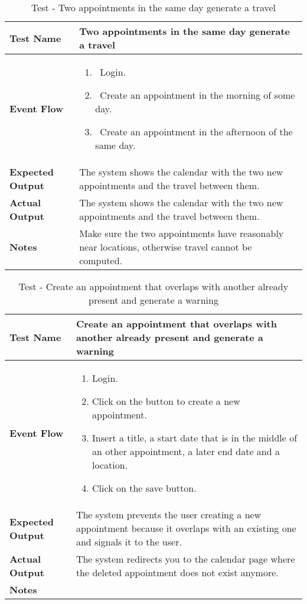 \begin{table}[h]	
\centering
\def\arraystretch{1.5}
\begin{tabular}{|m{7cm}|m{7cm}|}
	\hline
	\textbf{Test Name}            &  Two appointments in the same day generate a travel  \\ \hline
	\textbf{Event Flow}             & 
		\begin{enumerate}
			\item~Login.
			\item~Create an appointment in the morning of some day.
			\item~Create an appointment in the afternoon of the same day.
		\end{enumerate}
	  \\ \hline
	\textbf{Expected Output}  &   The system shows the calendar with the two new appointments and the travel between them.  \\ \hline
	\textbf{Actual Output}       &  The system shows the calendar with the two new appointments and the travel between them.   \\ \hline
	\textbf{Notes} &  Make sure the two appointments have reasonably near locations, otherwise travel cannot be computed.  \\ \hline
\end{tabular}
\caption{Test - Two appointments in the same day generate a travel}
\end{table}


\begin{table}[h]	
	\centering
	\def\arraystretch{1.5}
	\begin{tabular}{|m{7cm}|m{7cm}|}
		\hline
		\textbf{Test Name}            & Create an appointment that overlaps with another already present and generate a warning  \\ \hline
		\textbf{Event Flow}             & 
		\begin{enumerate}
			\item Login.
			\item Click on the button to create a new appointment.
			\item Insert a title, a start date that is in the middle of an other appointment, a later end date and a location.
			\item Click on the save button.
		\end{enumerate} \\ \hline
		\textbf{Expected Output}  &  The system prevents the user creating a new appointment because it overlaps with an existing one and signals it to the user.  \\ \hline
		\textbf{Actual Output}       & The system redirects you to the calendar page where the deleted appointment does not exist anymore.    \\ \hline
		\textbf{Notes} & \\ \hline
	\end{tabular}
	\caption{Test -  Create an appointment that overlaps with another already present and generate a warning }
\end{table}


